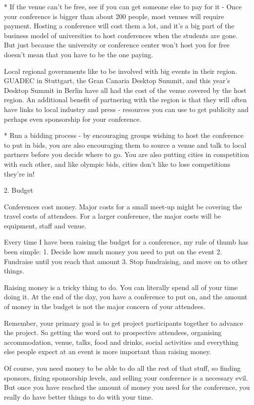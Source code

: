        * If the venue can't be free, see if you can get someone else to pay
for it - Once your conference is bigger than about 200 people, most
venues will require payment. Hosting a conference will cost them a lot,
and it's a big part of the business model of universities to host
conferences when the students are gone. But just because the university
or conference center won't host you for free doesn't mean that you have
to be the one paying.

       Local regional governments like to be involved with big events in their
region. GUADEC in Stuttgart, the Gran Canaria Desktop Summit, and this
year's Desktop Summit in Berlin have all had the cost of the venue
covered by the host region. An additional benefit of partnering with the
region is that they will often have links to local industry and press -
resources you can use to get publicity and perhaps even sponsorship for
your conference.

       * Run a bidding process - by encouraging groups wishing to host the
conference to put in bids, you are also encouraging them to source a
venue and talk to local partners before you decide where to go. You are
also putting cities in competition with each other, and like olympic
bids, cities don't like to lose competitions they're in!

2. Budget

Conferences cost money. Major costs for a small meet-up might be
covering the travel costs of attendees. For a larger conference, the
major costs will be equipment, staff and venue.

Every time I have been raising the budget for a conference, my rule of
thumb has been simple:
 1. Decide how much money you need to put on the event
 2. Fundraise until you reach that amount
 3. Stop fundraising, and move on to other things.

Raising money is a tricky thing to do. You can literally spend all of
your time doing it. At the end of the day, you have a conference to put
on, and the amount of money in the budget is not the major concern of
your attendees.

Remember, your primary goal is to get project participants together to
advance the project. So getting the word out to prospective attendees,
organising accommodation, venue, talks, food and drinks, social
activities and everything else people expect at an event is more
important than raising money.

Of course, you need money to be able to do all the rest of that stuff,
so finding sponsors, fixing sponsorship levels, and selling your
conference is a necessary evil. But once you have reached the amount of
money you need for the conference, you really do have better things to
do with your time.

